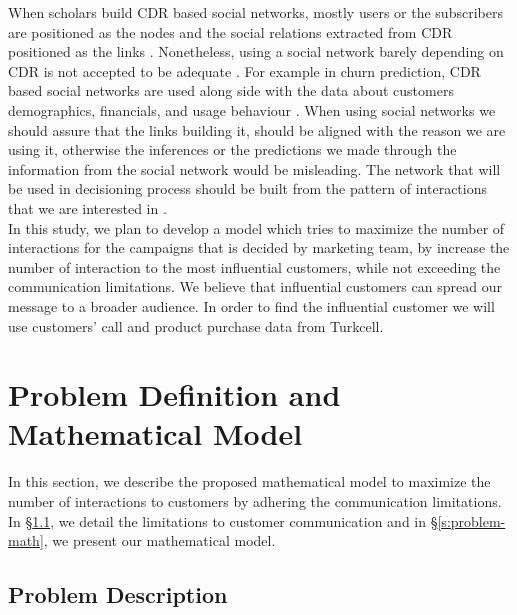\documentclass[11pt]{article}
\begin{document}
When scholars build CDR based social networks, mostly users or the subscribers are positioned as the nodes and the social relations extracted from CDR positioned as the links \citep{verbeke, oskarsdottir}. Nonetheless, using a social network barely depending on CDR is not accepted to be adequate \citep{backiel}. For example in churn prediction, CDR based social networks are used along side with the data about customers demographics, financials, and usage behaviour \citep{kusuma, backiel, oskarsdottir}. When using social networks we should assure that the links building it, should be aligned with the reason we are using it, otherwise the inferences or the predictions we made through the information from the social network would be misleading. The network that will be used in decisioning process should be built from the pattern of interactions that we are interested in \citep{huberman}.
\\


In this study, we plan to develop a model which tries to maximize the number of interactions for the campaigns that is decided by marketing team, by increase the number of interaction to the most influential customers, while not exceeding the communication limitations. We believe that influential customers can spread our message to a broader audience. In order to find the influential customer we will use customers' call and product purchase data from Turkcell.

\section{Problem Definition and Mathematical Model}  \label{s:problem-model}

In this section, we describe the proposed mathematical model to maximize the number of interactions to customers by adhering the communication limitations. In \S \ref{s:problem-desc}, we detail the limitations to customer communication and in \S \ref{s:problem-math}, we present our mathematical model.

\subsection{Problem Description} \label{s:problem-desc}
\end{document}
